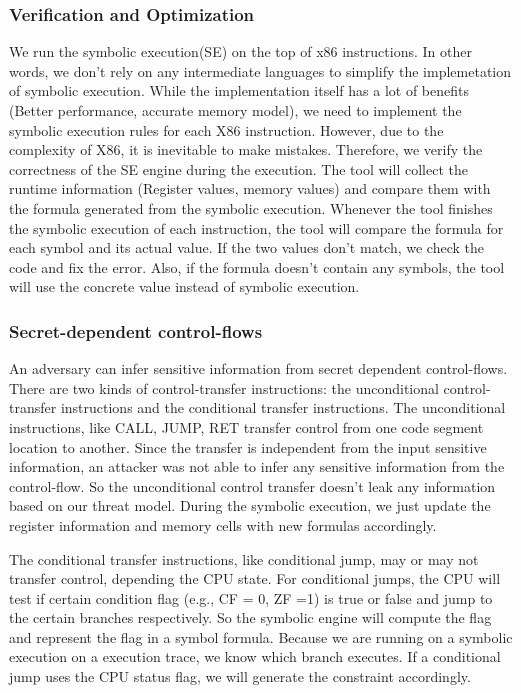 \subsubsection{Verification and Optimization}
We run the symbolic execution(SE) on the top of x86 instructions.
In other words, we don’t rely on any intermediate languages to 
simplify the implemetation of symbolic execution. 
While the implementation itself 
has a lot of benefits (Better performance, accurate memory model), 
we need to implement the symbolic execution 
rules for each X86 instruction. 
However, due to the complexity of X86, it is inevitable to make mistakes. 
Therefore, we verify the correctness of the SE engine during the execution. 
The tool will collect the runtime information (Register values, 
memory values) and compare them with the formula generated from the 
symbolic execution. Whenever the tool finishes the symbolic execution 
of each instruction, the tool will compare the formula for each symbol 
and its actual value. If the two values don’t match, we check the code
and fix the error. Also, if the formula doesn’t contain any symbols,
the tool will use the concrete value instead of symbolic execution.

\subsubsection{Secret-dependent control-flows}
An adversary can infer sensitive information from secret dependent control-flows. 
There are two kinds of control-transfer instructions: the unconditional 
control-transfer instructions and the conditional transfer instructions.
The unconditional instructions, like CALL, JUMP, RET transfer control
from one code segment location to another. Since the transfer is 
independent from the input sensitive information, an attacker was 
not able to infer any sensitive information from the control-flow. 
So the unconditional control transfer doesn’t leak any information 
based on our threat model. During the symbolic execution, 
we just update the register information and memory cells with new formulas accordingly.

The conditional transfer instructions, like conditional jump, may or may not transfer control, 
depending the CPU state. For conditional jumps, the CPU will test if certain condition flag 
(e.g., CF = 0, ZF =1) is true or false and jump to the certain branches respectively.
So the symbolic engine will compute the flag and represent the flag in a symbol formula. 
Because we are running on a symbolic execution on a execution trace, we know which branch executes.
If a conditional jump uses the CPU status flag, we will generate the constraint accordingly.

